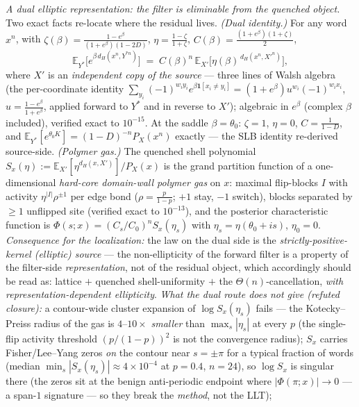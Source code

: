 \documentclass[
]{article}
\begin{document}
\emph{A dual elliptic representation: the filter is eliminable from the quenched object.} Two exact
facts re-locate where the residual lives. \emph{(Dual identity.)} For any word $x^n$, with
$\zeta(\beta)=\frac{1-e^{\beta}}{(1+e^{\beta})(1-2D)}$, $\eta=\frac{1-\zeta}{1+\zeta}$,
$C(\beta)=\frac{(1+e^{\beta})(1+\zeta)}2$,
\[
  \mathbb E_{Y^{*}}\!\big[e^{\beta\,d_H(x^n,Y^{*n})}\big]
  \;=\;C(\beta)^{n}\,\mathbb E_{X'}\!\big[\eta(\beta)^{\,d_H(x^n,X'^n)}\big],
\]
where $X'$ is an \emph{independent copy of the source} --- three lines of Walsh algebra (the
per-coordinate identity $\sum_{y_i}(-1)^{w_iy_i}e^{\beta\mathbf 1[x_i\ne y_i]}=(1+e^\beta)u^{w_i}
(-1)^{w_ix_i}$, $u=\frac{1-e^\beta}{1+e^\beta}$, applied forward to $Y^*$ and in reverse to $X'$);
algebraic in $e^\beta$ (complex $\beta$ included), verified exact to $10^{-15}$. At the saddle
$\beta=\theta_0$: $\zeta=1$, $\eta=0$, $C=\frac1{1-D}$, and $\mathbb E_{Y^*}[e^{\theta_0K}]
=(1-D)^{-n}P_X(x^n)$ exactly --- the SLB identity re-derived source-side. \emph{(Polymer gas.)} The
quenched shell polynomial $S_x(\eta):=\mathbb E_{X'}[\eta^{d_H(x,X')}]/P_X(x)$ is the grand partition
function of a one-dimensional \emph{hard-core domain-wall polymer gas} on $x$: maximal flip-blocks $I$
with activity $\eta^{|I|}\rho^{\pm1}$ per edge bond ($\rho=\frac p{1-p}$; $+1$ stay, $-1$ switch),
blocks separated by $\ge1$ unflipped site (verified exact to $10^{-13}$), and the posterior
characteristic function is $\Phi(s;x)=(C_s/C_0)^n S_x(\eta_s)$ with $\eta_s=\eta(\theta_0+is)$,
$\eta_0=0$. \emph{Consequence for the localization:} the law on the dual side is the
\emph{strictly-positive-kernel (elliptic) source} --- the non-ellipticity of the forward filter is a
property of the filter-side \emph{representation}, not of the residual object, which accordingly should
be read as: lattice $+$ quenched shell-uniformity $+$ the $\Theta(n)$-cancellation, \emph{with
representation-dependent ellipticity}. \emph{What the dual route does not give (refuted closure):} a
contour-wide cluster expansion of $\log S_x(\eta_s)$ fails --- the Kotecky--Preiss radius of the gas is
$4$--$10\times$ \emph{smaller} than $\max_s|\eta_s|$ at every $p$ (the single-flip activity threshold
$(p/(1-p))^2$ is not the convergence radius); $S_x$ carries Fisher/Lee--Yang zeros \emph{on} the contour
near $s=\pm\pi$ for a typical fraction of words (median $\min_s|S_x(\eta_s)|\approx4\times10^{-4}$ at
$p=0.4$, $n=24$), so $\log S_x$ is singular there (the zeros sit at the benign anti-periodic endpoint
where $|\Phi(\pi;x)|\to0$ --- a span-$1$ signature --- so they break the \emph{method}, not the LLT);
\end{document}
